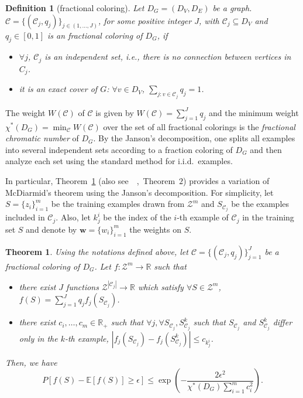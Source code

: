 \documentclass[letterpaper]{article} %
\newtheorem{theorem}{Theorem}
\newtheorem{definition}{Definition}
\newcommand{\E}{\mathbb{E}}
\newcommand{\Pro}{P}
\newcommand{\weight}{\mathbf{w}}
\newcommand{\real}{\mathbb{R}}
\newcommand{\zspace}{\mathcal{Z}}
\newcommand{\fcoloring}{\chi^*}
\newcommand{\set}[1]{\{#1\}}
\newcommand{\trainingset}{S}
\newcommand{\citep}[3]{(#1\ \citeauthor{#3}\ \citeyear{#3},\ #2)}
\begin{document}
\begin{definition}[fractional coloring]
  Let $D_G=(D_V,D_E)$ be a graph. $\mathcal{C}=\set{(\mathcal{C}_j,q_j)}_{j\in (1,\dots,J)}$, for some positive integer $J$, with $\mathcal{C}_j\subseteq D_V$ and $q_j\in [0,1]$ is an fractional coloring of $D_G$, if
  \begin{itemize}
    \item $\forall j$, $\mathcal{C}_j$ is an independent set, i.e., there is no connection between vertices in $C_j$.
    \item it is an exact cover of $G$: $\forall v \in D_V$, $\sum_{j: v\in \mathcal{C}_j} q_j = 1$.
  \end{itemize}
\end{definition}
The weight $W(\mathcal{C})$ of $\mathcal{C}$ is given by $W(\mathcal{C})=\sum_{j=1}^J q_j$ and the minimum weight $\fcoloring{}(D_G)=\min_{\mathcal{C}} W(\mathcal{C})$ over the set of all fractional colorings is the \emph{fractional chromatic number} of $D_G$.
By the Janson's decomposition, one splits all examples into several independent sets according to a fraction coloring of $D_G$ and then analyze each set using the standard method for i.i.d.\ examples.

In particular, Theorem~\ref{th:fractional_mcdiarmid} \citep{also see}{Theorem~$2$}{Usunier2005} provides a variation of McDiarmid's theorem using the Janson's decomposition.
For simplicity, let $\trainingset=\set{z_i}_{i=1}^{m}$ be the training examples drawn from $\zspace^m$ and $S_{\mathcal{C}_j}$ be the examples included in $\mathcal{C}_j$.
Also, let $k_j^i$ be the index of the $i$-th example of $\mathcal{C}_j$ in the training set $S$ and denote by $\weight{}=\set{w_i}_{i=1}^m$ the weights on $S$.

\begin{theorem}
   \label{th:fractional_mcdiarmid}
   Using the notations defined above, let $\mathcal{C} = \set{(\mathcal{C}_j, q_j)}_{j=1}^J$ be a fractional coloring of $D_G$. Let $f:\zspace^m \to \real{}$ such that
   \begin{itemize}
     \item there exist $J$ functions $\zspace^{|\mathcal{C}_j|} \to \real{}$ which satisfy $\forall S\in \zspace^m$, $f(S)=\sum_{j=1}^J q_j f_j(S_{\mathcal{C}_j})$.
     \item there exist $c_i,\dots,c_m\in \real{}_+$ such that $\forall j,\forall S_{\mathcal{C}_j}, S_{\mathcal{C}_j}^k$ such that $S_{\mathcal{C}_j}$ and $S_{\mathcal{C}_j}^k$ differ only in the $k$-th example, $|f_j(S_{\mathcal{C}_j}) - f_j(S_{\mathcal{C}_j}^k)|\le c_{k_j^i}$.
   \end{itemize}
     Then, we have
     \[\Pro[f(S)-\E[f(S)]\ge \epsilon] \le \exp\left(-\frac{2\epsilon^2}{\fcoloring{}(D_G)\sum_{i=1}^mc_i^2}\right).\]
 \end{theorem}
\end{document}
